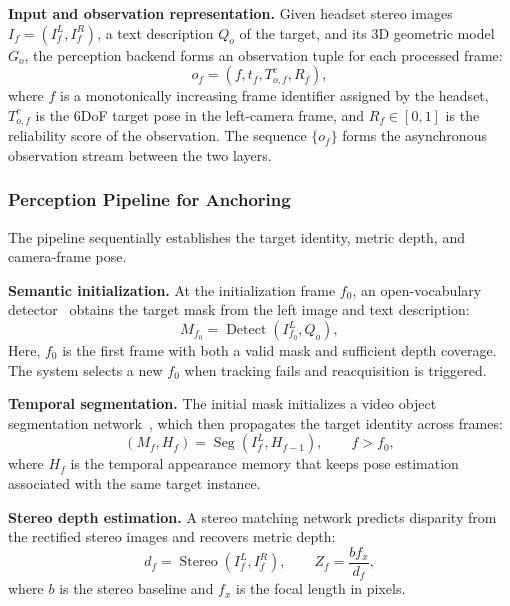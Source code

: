 \documentclass[review]{vgtc}
\begin{document}
\textbf{Input and observation representation.}
Given headset stereo images $I_f = (I_f^L, I_f^R)$, a text description $Q_o$ of the target, and its 3D geometric model $G_o$, the perception backend forms an observation tuple for each processed frame:
\begin{equation}
o_f = (f, t_f, T_{o,f}^{c}, R_f),
\label{eq:observation}
\end{equation}
where $f$ is a monotonically increasing frame identifier assigned by the headset, $T_{o,f}^{c}$ is the 6DoF target pose in the left-camera frame, and $R_f \in [0,1]$ is the reliability score of the observation. The sequence $\{o_f\}$ forms the asynchronous observation stream between the two layers.

\subsubsection{Perception Pipeline for Anchoring}

The pipeline sequentially establishes the target identity, metric depth, and camera-frame pose.

\textbf{Semantic initialization.}
At the initialization frame $f_0$, an open-vocabulary detector~\cite{yoloe2025} obtains the target mask from the left image and text description:
\begin{equation}
M_{f_0} = \operatorname{Detect}(I_{f_0}^{L}, Q_o),
\label{eq:detect}
\end{equation}
Here, $f_0$ is the first frame with both a valid mask and sufficient depth coverage. The system selects a new $f_0$ when tracking fails and reacquisition is triggered.

\textbf{Temporal segmentation.}
The initial mask initializes a video object segmentation network~\cite{cutie2024}, which then propagates the target identity across frames:
\begin{equation}
(M_f, H_f) = \operatorname{Seg}(I_f^{L}, H_{f-1}), \qquad f > f_0,
\label{eq:seg}
\end{equation}
where $H_f$ is the temporal appearance memory that keeps pose estimation associated with the same target instance.

\textbf{Stereo depth estimation.}
A stereo matching network predicts disparity from the rectified stereo images and recovers metric depth:
\begin{equation}
d_f = \operatorname{Stereo}(I_f^{L}, I_f^{R}), \qquad Z_f = \frac{b f_x}{d_f},
\label{eq:depth}
\end{equation}
where $b$ is the stereo baseline and $f_x$ is the focal length in pixels.
\end{document}
